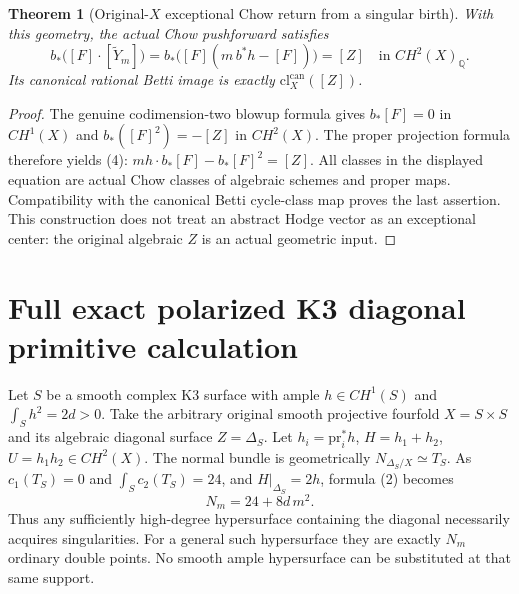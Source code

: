 \documentclass[11pt]{article}
\newtheorem{theorem}{Theorem}
\begin{document}
\begin{theorem}[Original-$X$ exceptional Chow return from a singular birth]
With this geometry, the actual Chow pushforward satisfies
\[
 \boxed{
 b_*\bigl([F]\cdot[\widetilde Y_m]\bigr)
 = b_*\bigl([F](m\,b^*h-[F])\bigr)
 = [Z]\quad\text{in }CH^2(X)_{\mathbb Q}.
 } \tag{4}
\]
Its canonical rational Betti image is exactly
$\mathrm{cl}_X^{\mathrm{can}}([Z])$.
\end{theorem}
\begin{proof}
The genuine codimension-two blowup formula gives
$b_*[F]=0$ in $CH^1(X)$ and
$b_*([F]^2)=-[Z]$ in $CH^2(X)$.
The proper projection formula therefore yields (4):
$m h\cdot b_*[F]-b_*[F]^2=[Z]$.
All classes in the displayed equation are actual Chow
classes of algebraic schemes and proper maps.
Compatibility with the canonical Betti cycle-class map
proves the last assertion. This construction does not
treat an abstract Hodge vector as an exceptional center:
the original algebraic $Z$ is an actual geometric input.
\end{proof}

\section{Full exact polarized K3 diagonal primitive calculation}
Let $S$ be a smooth complex K3 surface with ample
$h\in CH^1(S)$ and $\int_S h^2=2d>0$.
Take the arbitrary original smooth projective fourfold
$X=S\times S$ and its algebraic diagonal surface
$Z=\Delta_S$. Let $h_i=\mathrm{pr}_i^*h$,
$H=h_1+h_2$, $U=h_1h_2\in CH^2(X)$.
The normal bundle is geometrically
$N_{\Delta_S/X}\simeq T_S$.
As $c_1(T_S)=0$ and $\int_S c_2(T_S)=24$,
and $H|_{\Delta_S}=2h$, formula (2) becomes
\[
 \boxed{N_m=24+8d\,m^2.}                              \tag{5}
\]
Thus any sufficiently high-degree hypersurface containing
the diagonal necessarily acquires singularities. For a
general such hypersurface they are exactly $N_m$
ordinary double points. No smooth ample hypersurface can
be substituted at that same support.
\end{document}
